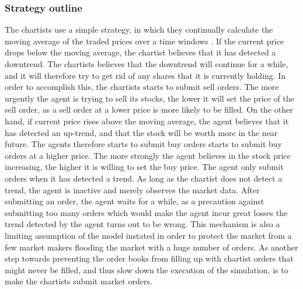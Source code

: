 \subsubsection{Strategy outline}
The chartists use a simple strategy, in which they continually calculate the moving average of the traded prices over a time windows \cite{izumi2009evaluation}. If the current price drops below the moving average, the chartist believes that it has detected a downtrend. The chartists believes that the downtrend will continue for a while, and it will therefore try to get rid of any shares that it is currently holding. In order to accomplish this, the chartists starts to submit sell orders. The more urgently the agent is trying to sell its stocks, the lower it will set the price of the sell order, as a sell order at a lower price is more likely to be filled. On the other hand, if current price rises above the moving average, the agent believes that it has detected an up-trend, and that the stock will be worth more in the near future. The agents therefore starts to submit buy orders starts to submit buy orders at a higher price. The more strongly the agent believes in the stock price increasing, the higher it is willing to set the buy price. The agent only submit orders when it has detected a trend. As long as the chartist does not detect a trend, the agent is inactive and merely observes the market data.  After submitting an order, the agent waits for a while, as a precaution against submitting too many orders which would make the agent incur great losses the trend detected by the agent turns out to be wrong. This mechanism is also a limiting assumption of the model instated in order to protect the market from a few market makers flooding the market with a huge number of orders. As another step towards preventing the order books from filling up with chartist orders that might never be filled, and thus slow down the execution of the simulation, is to make the chartists submit market orders.


